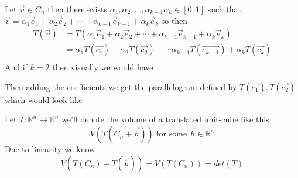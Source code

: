 \documentclass[11pt]{book}
\begin{document}
\begin{remark}
    Let $\vec{v} \in C_{n} $ then there exists $\alpha _{1}, \alpha _{2}, \ldots, \alpha _{k - 1} \alpha _{k} \in \left[ 0,1 \right] $ such that $\vec{v} = \alpha _{1}\vec{e} _{1}  +  \alpha _{2}\vec{e} _{2}  +  \dotsb   +  \alpha _{k - 1}\vec{e} _{k - 1}  +  \alpha _{k}\vec{e} _{k} $ so then 
    \begin{align*}
        T\left(\vec{v} \right) &= T\left(\alpha _{1}\vec{e} _{1}  +  \alpha _{2}\vec{e} _{2}  +  \dotsb   +  \alpha _{k - 1}\vec{e} _{k - 1}  +  \alpha _{k}\vec{e} _{k} \right)   \\ 
        &= \alpha _{1}T\left(\vec{e_{1} } \right)  +   \alpha _{2}T\left(\vec{e_{2} } \right)  +   \dotsb   \alpha _{k - 1}T\left(\vec{e_{k - 1} } \right)  +   \alpha _{k}T\left(\vec{e_{k} } \right)  \\ 
    \end{align*}
    And if $k= 2$ then visually we would have
    \begin{center}
    \end{center}
    Then adding the coefficients we get the parallelogram defined by $T\left(\vec{e_1} \right) , T\left(\vec{e_2} \right) $ which would look like
    \begin{center}
    \end{center}
\end{remark}

\begin{remark}
    Let $T : \mathbb{R} ^{n}  \to \mathbb{R} ^{n}  $ we'll denote the volume of a translated unit-cube like this
    \[
    V\left(T\left(C_{n}  + \vec{b} \right) \right) \text{ for some  } \vec{b} \in \mathbb{R} ^{n} 
    \]
    Due to linearity we know
    \begin{equation*}
        V\left(T\left(C_{n} \right)  + T\left(\vec{b} \right) \right) = V\left(T\left(C_{n} \right) \right) = \mathit{det} \left(T\right) 
    \end{equation*}
\end{remark}
\end{document}
